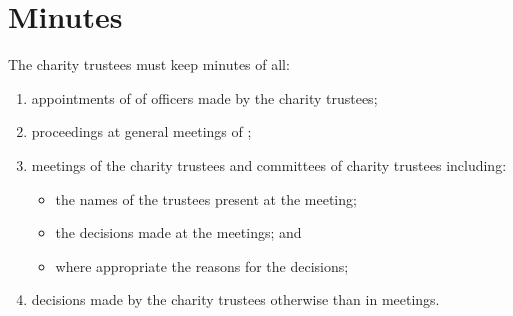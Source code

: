 \section{Minutes}\label{sec:minutes}
The charity trustees must keep minutes of all:
\begin{enumerate}
    \item appointments of of officers made by the charity trustees;
    \item proceedings at general meetings of \shortname{};
    \item meetings of the charity trustees and committees of charity trustees including:
    \begin{itemize}
        \item the names of the trustees present at the meeting;
        \item the decisions made at the meetings; and
        \item where appropriate the reasons for the decisions;
    \end{itemize}
    \item decisions made by the charity trustees otherwise than in meetings.
\end{enumerate}
